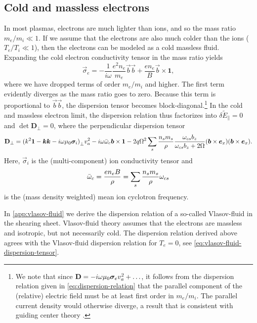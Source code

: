 \documentclass[aps,pre,notitlepage,amsmath,amssymb,amsfonts,nobibnotes,nofootinbib,superscriptaddress]{revtex4-1}
\begin{document}
\subsection{Cold and massless electrons}
\label{sec:cold-e}

In most plasmas, electrons are much lighter than ions, and so the mass ratio
$m_e/m_i\ll1$. If we assume that the electrons are also much colder than the
ions ($T_e/T_i\ll1$), then the electrons can be modeled as a cold massless
fluid. Expanding the cold electron conductivity tensor in the mass ratio
yields
\begin{equation}
  \label{eq:cold-electron-conductivity}
  \vec{\sigma}_e = -\frac{1}{i\omega}\frac{e^2n_e}{m_e}\vec{b}\vec{b}
  + \frac{en_e}{B}\vec{b}\times\mathbf{1},
\end{equation}
where we have dropped terms of order $m_e/m_i$ and higher. The first term
evidently diverges as the mass ratio goes to zero. Because this term is
proportional to $\vec{b}\vec{b}$, the dispersion tensor becomes
block-diagonal.\footnote{We note that since
  $\mathbf{D}=-i\omega\mu_0\bm{\sigma}_ev_a^2+\ldots$, it follows from the
  dispersion relation given in \cref{eq:dispersion-relation} that the parallel
  component of the (relative) electric field must be at least first order in
  $m_e/m_i$. The parallel current density would otherwise diverge, a result
  that is consistent with guiding center theory \citep[e.g.][]{Grad1961}.} In
the cold and massless electron limit, the dispersion relation thus factorizes
into $\delta{}\tilde{E}_\parallel=0$ and $\det\mathbf{D}_\perp=0$, where the
perpendicular dispersion tensor
\begin{equation}
  \label{eq:perpendicular-dispersion}
  \mathbf{D}_\perp =
  {(k^2\mathbf{1} - \vec{k}\vec{k} - i\omega\mu_0\vec{\sigma}_i)}_\perp\va^2
  - i\omega\ome\vec{b}\times\mathbf{1}
  - 2q\Omega^2\sums\frac{n_s{}m_s}{\rho}\frac{\omcs b_z}{\omcs b_z + 2\Omega}
  (\vec{b}\times\ex)(\vec{b}\times\ex).
\end{equation}
Here, $\vec{\sigma}_i$ is the (multi-component) ion conductivity tensor and
\begin{equation}
  \bar{\omega}_c = \frac{en_e B}{\rho} = \sum_s\frac{n_s m_s}{\rho}\omega_{cs}
\end{equation}
is the (mass density weighted) mean ion cyclotron frequency.

In \cref{app:vlasov-fluid} we derive the dispersion relation of a so-called
Vlasov-fluid in the shearing sheet. Vlasov-fluid theory \citep{Freidberg1972}
assumes that the electrons are massless and isotropic, but not necessarily
cold. The dispersion relation derived above agrees with the Vlasov-fluid
dispersion relation for $T_e=0$, see \cref{eq:vlasov-fluid-dispersion-tensor}.
\end{document}

